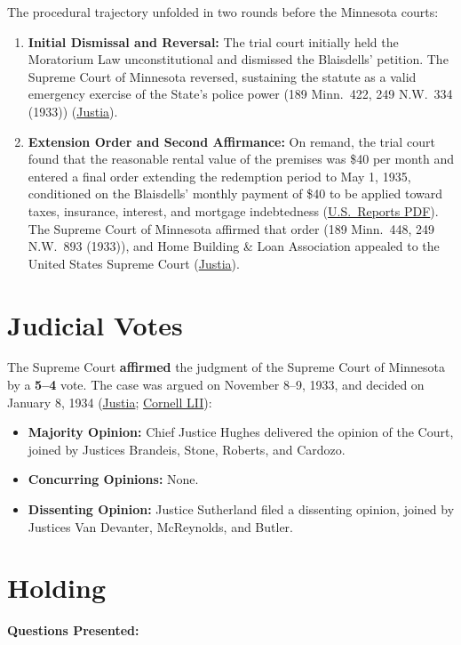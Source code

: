 \documentclass[12pt]{article}
\begin{document}
The procedural trajectory unfolded in two rounds before the Minnesota courts:
\begin{enumerate}
  \item \textbf{Initial Dismissal and Reversal:} The trial court initially held the Moratorium Law unconstitutional and dismissed the Blaisdells' petition. The Supreme Court of Minnesota reversed, sustaining the statute as a valid emergency exercise of the State's police power (189 Minn.\ 422, 249 N.W.\ 334 (1933)) (\href{https://supreme.justia.com/cases/federal/us/290/398/}{Justia}).
  \item \textbf{Extension Order and Second Affirmance:} On remand, the trial court found that the reasonable rental value of the premises was \$40 per month and entered a final order extending the redemption period to May 1, 1935, conditioned on the Blaisdells' monthly payment of \$40 to be applied toward taxes, insurance, interest, and mortgage indebtedness (\href{https://tile.loc.gov/storage-services/service/ll/usrep/usrep290/usrep290398/usrep290398.pdf}{U.S.\ Reports PDF}). The Supreme Court of Minnesota affirmed that order (189 Minn.\ 448, 249 N.W.\ 893 (1933)), and Home Building \& Loan Association appealed to the United States Supreme Court (\href{https://supreme.justia.com/cases/federal/us/290/398/}{Justia}).
\end{enumerate}

\section{Judicial Votes}
The Supreme Court \textbf{affirmed} the judgment of the Supreme Court of Minnesota by a \textbf{5--4} vote. The case was argued on November 8--9, 1933, and decided on January 8, 1934 (\href{https://supreme.justia.com/cases/federal/us/290/398/}{Justia}; \href{https://www.law.cornell.edu/supremecourt/text/290/398}{Cornell LII}):

\begin{itemize}
    \item \textbf{Majority Opinion:} Chief Justice Hughes delivered the opinion of the Court, joined by Justices Brandeis, Stone, Roberts, and Cardozo.
    \item \textbf{Concurring Opinions:} None.
    \item \textbf{Dissenting Opinion:} Justice Sutherland filed a dissenting opinion, joined by Justices Van Devanter, McReynolds, and Butler.
\end{itemize}

\section{Holding}
\textbf{Questions Presented:}
\end{document}
